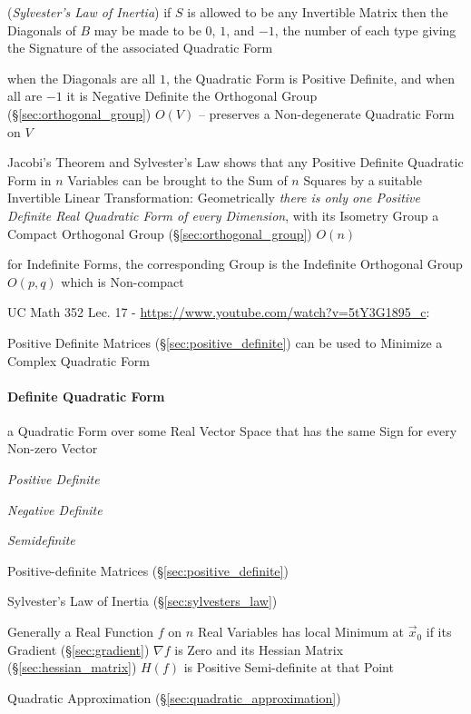 (\emph{Sylvester's Law of Inertia}) if $S$ is allowed to be any Invertible
Matrix then the Diagonals of $B$ may be made to be $0$, $1$, and $-1$, the
number of each type giving the Signature of the associated Quadratic Form

when the Diagonals are all $1$, the Quadratic Form is Positive Definite, and
when all are $-1$ it is Negative Definite
the Orthogonal Group (\S\ref{sec:orthogonal_group}) $O(V)$ -- preserves a
Non-degenerate Quadratic Form on $V$

Jacobi's Theorem and Sylvester's Law shows that any Positive Definite Quadratic
Form in $n$ Variables can be brought to the Sum of $n$ Squares by a suitable
Invertible Linear Transformation: Geometrically \emph{there is only one
  Positive Definite Real Quadratic Form of every Dimension}, with its Isometry
Group a Compact Orthogonal Group (\S\ref{sec:orthogonal_group}) $O(n)$

for Indefinite Forms, the corresponding Group is the Indefinite Orthogonal
Group $O(p,q)$ which is Non-compact


UC Math 352 Lec. 17 - \url{https://www.youtube.com/watch?v=5tY3G1895_c}:

Positive Definite Matrices (\S\ref{sec:positive_definite}) can be used to
Minimize a Complex Quadratic Form



\paragraph{Definite Quadratic Form}\label{sec:definite_quadratic}\hfill

a Quadratic Form over some Real Vector Space that has the same Sign
for every Non-zero Vector

\emph{Positive Definite}

\emph{Negative Definite}

\emph{Semidefinite}

\fist Positive-definite Matrices (\S\ref{sec:positive_definite})

\fist Sylvester's Law of Inertia (\S\ref{sec:sylvesters_law})

Generally a Real Function $f$ on $n$ Real Variables has local Minimum at
$\vec{x}_0$ if its Gradient (\S\ref{sec:gradient}) $\nabla f$ is Zero and its
Hessian Matrix (\S\ref{sec:hessian_matrix}) $H(f)$ is Positive Semi-definite at
that Point

\fist Quadratic Approximation (\S\ref{sec:quadratic_approximation})

